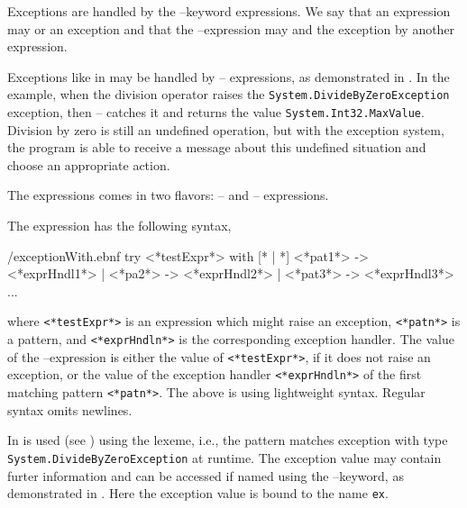 \documentclass[fsharpnotes.tex]{subfiles}
\begin{document}
Exceptions are handled by the --keyword expressions. We say that an expression may  or  an exception and that the --expression may  and  the exception by another expression.

Exceptions like in  may be handled by -- expressions, as demonstrated in .
%
%
In the example, when the division operator raises the \lstinline{System.DivideByZeroException} exception, then -- catches it and returns the value \lstinline{System.Int32.MaxValue}. Division by zero is still an undefined operation, but with the exception system, the program is able to receive a message about this undefined situation and choose an appropriate action.

The  expressions comes in two flavors: -- and -- expressions.

The  expression has the following syntax,
%
\begin{verbatimwrite}{\ebnf/exceptionWith.ebnf}
try
   <*testExpr*>
with
   [* | *] <*pat1*> -> <*exprHndl1*>
   | <*pa2*> -> <*exprHndl2*>
   | <*pat3*> -> <*exprHndl3*>
   ...
\end{verbatimwrite}
%
where \lstinline[language=syntax]{<*testExpr*>} is an expression which might raise an exception, \lstinline[language=syntax]{<*patn*>} is a pattern, and \lstinline[language=syntax]{<*exprHndln*>} is the corresponding exception handler. The value of the --expression is either the value of \lstinline[language=syntax]{<*testExpr*>}, if it does not raise an exception, or the value of the exception handler \lstinline[language=syntax]{<*exprHndln*>} of the first matching pattern \lstinline[language=syntax]{<*patn*>}. The above is using lightweight syntax. Regular syntax omits newlines.

In   is used (see ) using the  lexeme, i.e., the pattern matches exception with type \lstinline{System.DivideByZeroException} at runtime. The exception value may contain furter information and can be accessed if named using the --keyword, as demonstrated in .
%
%
Here the exception value is bound to the name \lstinline{ex}.
\end{document}
